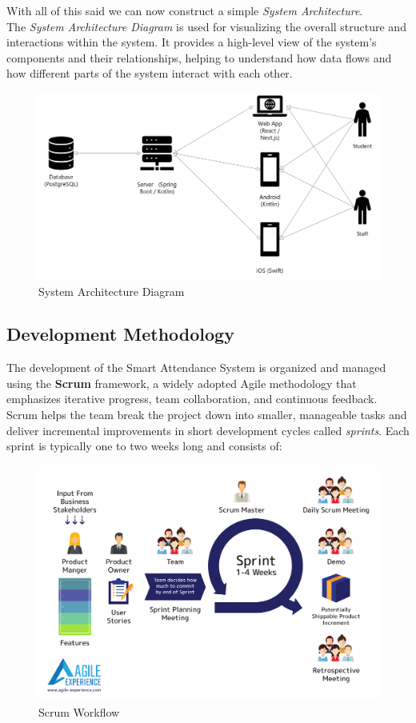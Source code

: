 \documentclass[a4paper, 12pt]{article}
\begin{document}
      \noindent With all of this said we can now construct a simple \emph{System Architecture}. \\ 
      The \emph{System Architecture Diagram} is used for visualizing the overall structure and interactions 
      within the system. It provides a high-level view of the system's components and their relationships, 
      helping to understand how data flows and how different parts of the system interact with each other.

      \begin{figure}[h]
        \centering
        \includegraphics[width=\textwidth]{SystemArchitecture.png}
        \caption{System Architecture Diagram}
        \label{fig:system-architecture-diagram}
      \end{figure}

      \newpage

    \subsection{Development Methodology}

      The development of the Smart Attendance System is organized and managed using the \textbf{Scrum} framework, a widely adopted Agile methodology that emphasizes iterative progress, team collaboration, and continuous feedback. \\

      Scrum helps the team break the project down into smaller, manageable tasks and deliver incremental improvements in short development cycles called \emph{sprints}. Each sprint is typically one to two weeks long and consists of: 

      \begin{figure}[h]
        \centering
        \includegraphics[width=.7\textwidth]{Scrum_Workflow.png}
        \caption{Scrum Workflow}
        \label{fig: scrum_workflow}
      \end{figure}
\end{document}
